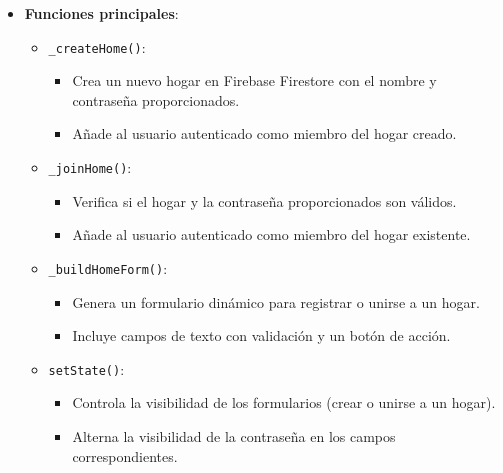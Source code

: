 \documentclass{article}
\begin{document}
\begin{flushleft}
\begin{itemize}
    \item \textbf{Funciones principales}:
    \begin{itemize}
        \item \texttt{\_createHome()}:
        \begin{itemize}
            \item Crea un nuevo hogar en Firebase Firestore con el nombre y contrase\~na proporcionados.
            \item A\~nade al usuario autenticado como miembro del hogar creado.
        \end{itemize}
        \item \texttt{\_joinHome()}:
        \begin{itemize}
            \item Verifica si el hogar y la contrase\~na proporcionados son v\'alidos.
            \item A\~nade al usuario autenticado como miembro del hogar existente.
        \end{itemize}
        \item \texttt{\_buildHomeForm()}:
        \begin{itemize}
            \item Genera un formulario din\'amico para registrar o unirse a un hogar.
            \item Incluye campos de texto con validaci\'on y un bot\'on de acci\'on.
        \end{itemize}
        \item \texttt{setState()}:
        \begin{itemize}
            \item Controla la visibilidad de los formularios (crear o unirse a un hogar).
            \item Alterna la visibilidad de la contrase\~na en los campos correspondientes.
        \end{itemize}
    \end{itemize}
\end{itemize}
 


\end{flushleft}
\end{document}

